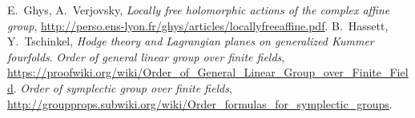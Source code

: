 \documentclass{amsart}
\theoremstyle{plain}
\theoremstyle{definition}
\theoremstyle{remark}
\begin{document}

\begin{thebibliography}{10}
  E.~Ghys, A.~Verjovsky, \emph{Locally free holomorphic actions of the complex affine group}, \url{http://perso.ens-lyon.fr/ghys/articles/locallyfreeaffine.pdf}.
  B.~Hassett, Y.~Tschinkel, \emph{Hodge theory and Lagrangian planes on generalized Kummer fourfolds}.
  \emph{Order of general linear group over finite fields}, \url{https://proofwiki.org/wiki/Order_of_General_Linear_Group_over_Finite_Field}.
  \emph{Order of symplectic group over finite fields}, \url{http://groupprops.subwiki.org/wiki/Order_formulas_for_symplectic_groups}.
\end{thebibliography}
\end{document}
